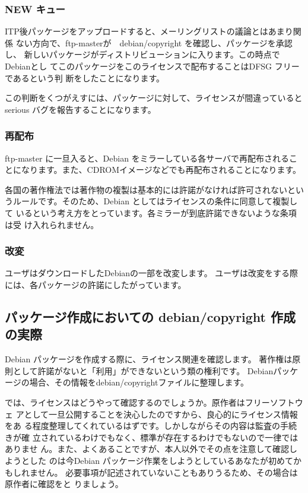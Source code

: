 \documentclass[mingoth,a4paper]{jsarticle}
\begin{document}
\subsubsection{NEW キュー}

ITP後パッケージをアップロードすると、メーリングリストの議論とはあまり関係
ない方向で、ftp-masterが　debian/copyright を確認し、パッケージを承認し、
新しいパッケージがディストリビューションに入ります。この時点でDebianとし
てこのパッケージをこのライセンスで配布することはDFSG フリーであるという判
断をしたことになります。

この判断をくつがえすには、パッケージに対して、ライセンスが間違っていると
serious バグを報告することになります。

\subsubsection{再配布}

ftp-master に一旦入ると、Debian をミラーしている各サーバで再配布されるこ
とになります。また、CDROMイメージなどでも再配布されることになります。

各国の著作権法では著作物の複製は基本的には許諾がなければ許可されないとい
うルールです。そのため、Debian としてはライセンスの条件に同意して複製して
いるという考え方をとっています。各ミラーが到底許諾できないような条項は受
け入れられません。

\subsubsection{改変}

ユーザはダウンロードしたDebianの一部を改変します。
ユーザは改変をする際には、各パッケージの許諾にしたがっています。

\subsection{パッケージ作成においての debian/copyright 作成の実際}

Debian パッケージを作成する際に、ライセンス関連を確認します。
著作権は原則として許諾がないと「利用」ができないという類の権利です。
Debianパッケージの場合、その情報をdebian/copyrightファイルに整理します。

では、ライセンスはどうやって確認するのでしょうか。原作者はフリーソフトウェ
アとして一旦公開することを決心したのですから、良心的にライセンス情報をあ
る程度整理してくれているはずです。しかしながらその内容は監査の手続きが確
立されているわけでもなく、標準が存在するわけでもないので一律ではありませ
ん。また、よくあることですが、本人以外でその点を注意して確認しようとした
のは今Debian パッケージ作業をしようとしているあなたが初めてかもしれません。
必要事項が記述されていないこともありうるため、その場合は原作者に確認をと
りましょう。
\end{document}
